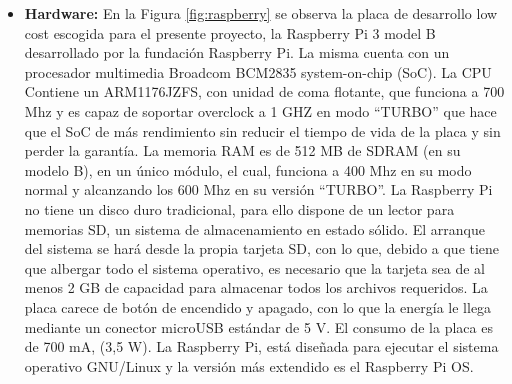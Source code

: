 \begin{itemize}
    \item \textbf{Hardware:}
    En la Figura \ref{fig:raspberry} se observa la placa de desarrollo low cost escogida para el presente proyecto, la Raspberry Pi 3 model B desarrollado por la fundación Raspberry Pi. La misma cuenta con un procesador multimedia Broadcom BCM2835 system-on-chip (SoC).
    La CPU Contiene un ARM1176JZFS, con unidad de coma flotante, que funciona a 700 Mhz y es capaz de soportar overclock a 1 GHZ en modo “TURBO” que hace que el SoC de más rendimiento sin reducir el tiempo de vida de la placa y sin perder la garantía. 
    La memoria RAM es de 512 MB de SDRAM (en su modelo B), en un único módulo, el cual, funciona a 400 Mhz en su modo normal y alcanzando los 600 Mhz en su versión “TURBO”.
    La  Raspberry Pi no tiene un disco duro tradicional, para ello dispone de un lector para memorias SD, un sistema de almacenamiento en estado sólido. El arranque del sistema se hará desde la propia tarjeta SD, con lo que, debido a que tiene que albergar todo el sistema operativo, es necesario que la tarjeta sea de al menos 2 GB de capacidad para almacenar todos los archivos requeridos.
    La placa carece de botón de encendido y apagado, con lo que la energía le llega mediante un conector microUSB estándar de 5 V. El consumo de la placa es de 700 mA, (3,5 W).
    La Raspberry Pi, está diseñada para ejecutar el sistema operativo GNU/Linux y la versi\'on m\'as extendido es el Raspberry Pi OS.
    

\end{itemize}
